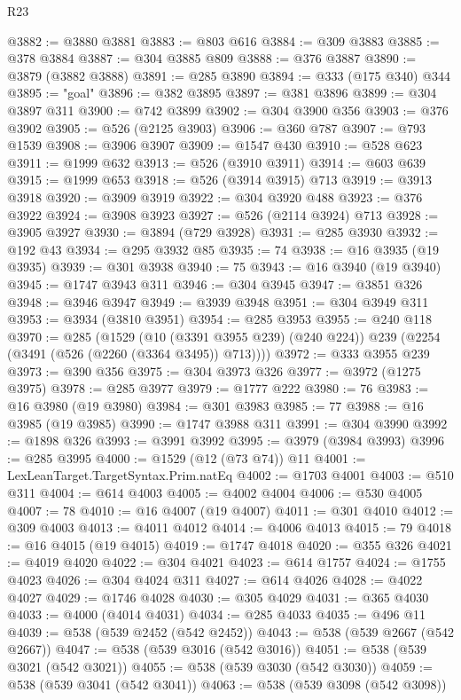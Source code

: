 \begin{lexlean}{R23}
\begin{coremodule}
@3882 := @3880 @3881
@3883 := @803 @616
@3884 := @309 @3883
@3885 := @378 @3884
@3887 := @304 @3885 @809
@3888 := @376 @3887
@3890 := @3879 (@3882 @3888)
@3891 := @285 @3890
@3894 := @333 (@175 @340) @344
@3895 := "goal"
@3896 := @382 @3895
@3897 := @381 @3896
@3899 := @304 @3897 @311
@3900 := @742 @3899
@3902 := @304 @3900 @356
@3903 := @376 @3902
@3905 := @526 (@2125 @3903)
@3906 := @360 @787
@3907 := @793 @1539
@3908 := @3906 @3907
@3909 := @1547 @430
@3910 := @528 @623
@3911 := @1999 @632
@3913 := @526 (@3910 @3911)
@3914 := @603 @639
@3915 := @1999 @653
@3918 := @526 (@3914 @3915) @713
@3919 := @3913 @3918
@3920 := @3909 @3919
@3922 := @304 @3920 @488
@3923 := @376 @3922
@3924 := @3908 @3923
@3927 := @526 (@2114 @3924) @713
@3928 := @3905 @3927
@3930 := @3894 (@729 @3928)
@3931 := @285 @3930
@3932 := @192 @43
@3934 := @295 @3932 @85
@3935 := 74
@3938 := @16 @3935 (@19 @3935)
@3939 := @301 @3938
@3940 := 75
@3943 := @16 @3940 (@19 @3940)
@3945 := @1747 @3943 @311
@3946 := @304 @3945
@3947 := @3851 @326
@3948 := @3946 @3947
@3949 := @3939 @3948
@3951 := @304 @3949 @311
@3953 := @3934 (@3810 @3951)
@3954 := @285 @3953
@3955 := @240 @118
@3970 := @285
    (@1529
      (@10 (@3391 @3955 @239) (@240 @224))
      @239
      (@2254 (@3491 (@526 (@2260 (@3364 @3495)) @713))))
@3972 := @333 @3955 @239
@3973 := @390 @356
@3975 := @304 @3973 @326
@3977 := @3972 (@1275 @3975)
@3978 := @285 @3977
@3979 := @1777 @222
@3980 := 76
@3983 := @16 @3980 (@19 @3980)
@3984 := @301 @3983
@3985 := 77
@3988 := @16 @3985 (@19 @3985)
@3990 := @1747 @3988 @311
@3991 := @304 @3990
@3992 := @1898 @326
@3993 := @3991 @3992
@3995 := @3979 (@3984 @3993)
@3996 := @285 @3995
@4000 := @1529 (@12 (@73 @74)) @11
@4001 := LexLeanTarget.TargetSyntax.Prim.natEq
@4002 := @1703 @4001
@4003 := @510 @311
@4004 := @614 @4003
@4005 := @4002 @4004
@4006 := @530 @4005
@4007 := 78
@4010 := @16 @4007 (@19 @4007)
@4011 := @301 @4010
@4012 := @309 @4003
@4013 := @4011 @4012
@4014 := @4006 @4013
@4015 := 79
@4018 := @16 @4015 (@19 @4015)
@4019 := @1747 @4018
@4020 := @355 @326
@4021 := @4019 @4020
@4022 := @304 @4021
@4023 := @614 @1757
@4024 := @1755 @4023
@4026 := @304 @4024 @311
@4027 := @614 @4026
@4028 := @4022 @4027
@4029 := @1746 @4028
@4030 := @305 @4029
@4031 := @365 @4030
@4033 := @4000 (@4014 @4031)
@4034 := @285 @4033
@4035 := @496 @11
@4039 := @538 (@539 @2452 (@542 @2452))
@4043 := @538 (@539 @2667 (@542 @2667))
@4047 := @538 (@539 @3016 (@542 @3016))
@4051 := @538 (@539 @3021 (@542 @3021))
@4055 := @538 (@539 @3030 (@542 @3030))
@4059 := @538 (@539 @3041 (@542 @3041))
@4063 := @538 (@539 @3098 (@542 @3098))

\end{coremodule}
\end{lexlean}
